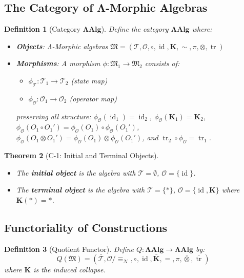 \documentclass[12pt, oneside]{article}
\newtheorem{theorem}{Theorem}[section]
\newtheorem{definition}[theorem]{Definition}
\DeclareMathOperator{\id}{id}
\DeclareMathOperator{\tr}{tr}
\newcommand{\K}{\mathbf{K}}
\newcommand{\N}{\mathcal{N}}
\newcommand{\T}{\mathcal{T}}
\newcommand{\Opr}{\mathcal{O}}
\newcommand{\mf}[1]{\mathfrak{#1}}
\begin{document}
\subsection{The Category of Λ-Morphic Algebras}

\begin{definition}[Category $\mathbf{ΛAlg}$]
Define the category $\mathbf{ΛAlg}$ where:
\begin{itemize}
    \item \textbf{Objects}: Λ-Morphic algebras $\mf{M} = (\T, \Opr, \circ, \id, \K, \sim, \pi, \otimes, \tr)$
    \item \textbf{Morphisms}: A morphism $\phi: \mf{M}_1 \rightarrow \mf{M}_2$ consists of:
    \begin{itemize}
        \item $\phi_{\T}: \T_1 \rightarrow \T_2$ (state map)
        \item $\phi_{\Opr}: \Opr_1 \rightarrow \Opr_2$ (operator map)
    \end{itemize}
    preserving all structure: $\phi_{\Opr}(\id_1) = \id_2$, $\phi_{\Opr}(\K_1) = \K_2$, $\phi_{\Opr}(O_1 \circ O_1') = \phi_{\Opr}(O_1) \circ \phi_{\Opr}(O_1')$, $\phi_{\Opr}(O_1 \otimes O_1') = \phi_{\Opr}(O_1) \otimes \phi_{\Opr}(O_1')$, and $\tr_2 \circ \phi_{\Opr} = \tr_1$.
\end{itemize}
\end{definition}

\begin{theorem}[C-1: Initial and Terminal Objects]
\begin{itemize}
    \item The \textbf{initial object} is the algebra with $\T = \emptyset$, $\Opr = \{\id\}$.
    \item The \textbf{terminal object} is the algebra with $\T = \{*\}$, $\Opr = \{\id, \K\}$ where $\K(*) = *$.
\end{itemize}
\end{theorem}

\subsection{Functoriality of Constructions}

\begin{definition}[Quotient Functor]
Define $Q: \mathbf{ΛAlg} \rightarrow \mathbf{ΛAlg}$ by:
\begin{equation}
Q(\mf{M}) = (\bar{\T}, \Opr/\!\equiv_\N, \circ, \id, \bar{\K}, =, \pi, \bar{\otimes}, \bar{\tr})
\end{equation}
where $\bar{\K}$ is the induced collapse.
\end{definition}
\end{document}
